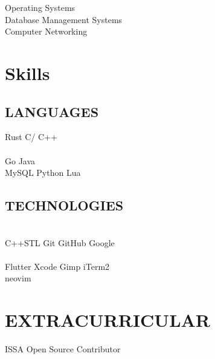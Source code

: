 \documentclass[]{deedy-resume-openfont}
\begin{document}
\begin{minipage}[t]{0.33\textwidth}
Operating Systems \\
Database Management Systems\\
Computer Networking





\section{Skills}
\subsection{LANGUAGES}
Rust \textbullet{}  C/ C++   \\
 \\ 
 Go \textbullet{} Java   \\
MySQL \textbullet{} Python \textbullet{} Lua\\ 
\sectionsep
\subsection{TECHNOLOGIES}
\\
C++STL \textbullet{} Git \textbullet{} GitHub \textbullet{} Google  \\
\\
Flutter \textbullet{} Xcode \textbullet{} Gimp \textbullet{} iTerm2 \\
neovim\\

\section{EXTRACURRICULAR}
ISSA  
Open Source Contributor 


%
%

\end{minipage} 
\end{document}
